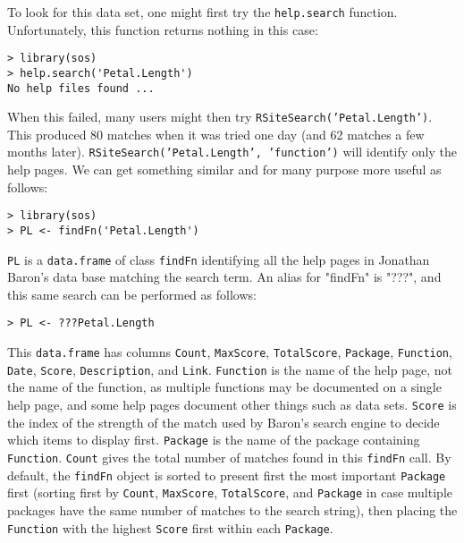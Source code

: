 To look for this data set, one might first try
the {\tt help.search} function.  Unfortunately, this function
returns nothing in this case:
\begin{verbatim}
> library(sos)
> help.search('Petal.Length')
No help files found ...
\end{verbatim}
When this failed, many users might then try
{\tt RSiteSearch('Petal.Length')}.  This produced 80 matches
when it was tried one day (and 62 matches a few months later).
{\tt RSiteSearch('Petal.Length', 'function')} will identify
only the help pages.  We can get something similar and for
many purpose more useful as follows:
\begin{verbatim}
> library(sos)
> PL <- findFn('Petal.Length')
\end{verbatim}
{\tt PL} is a {\tt data.frame} of class {\tt findFn} identifying
all the help pages in Jonathan Baron's data base matching the
search term.  An alias for "findFn" is "???", and this same 
search can be performed as follows:  
\begin{verbatim}
> PL <- ???Petal.Length
\end{verbatim}
This {\tt data.frame} has columns {\tt Count},
{\tt MaxScore}, {\tt TotalScore}, {\tt Package}, {\tt Function},
{\tt Date}, {\tt Score}, {\tt Description}, and {\tt Link}.
{\tt Function} is the name of the help page, not the name of the
function, as multiple functions may be documented on a single
help page, and some help pages document other things such as data
sets.  {\tt Score} is the index of the strength of the match used
by Baron's search engine to decide which items to display first.
{\tt Package} is the name of the package containing {\tt Function}.
{\tt Count} gives the total number of matches found in this
{\tt findFn} call.  By default, the {\tt findFn} object is sorted
to present first the most important {\tt Package} first (sorting first
by {\tt Count}, {\tt MaxScore},  {\tt TotalScore}, and {\tt Package}
in case multiple packages have the same number of matches to the
search string), then placing the {\tt Function} with the highest
{\tt Score} first within each {\tt Package}.

